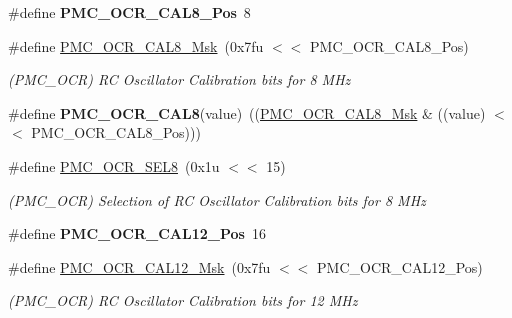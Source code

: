 \begin{DoxyCompactItemize}
\mbox{\label{group__SAMV71__PMC_gaeae5979b2df8f5a8d390e59e0e88dc6b}} 
\#define {\bfseries P\+M\+C\+\_\+\+O\+C\+R\+\_\+\+C\+A\+L8\+\_\+\+Pos}~8
\item 
\mbox{\label{group__SAMV71__PMC_gaa11a6b2f86faf3641f789b99e88f3413}} 
\#define \mbox{\hyperlink{group__SAMV71__PMC_gaa11a6b2f86faf3641f789b99e88f3413}{P\+M\+C\+\_\+\+O\+C\+R\+\_\+\+C\+A\+L8\+\_\+\+Msk}}~(0x7fu $<$$<$ P\+M\+C\+\_\+\+O\+C\+R\+\_\+\+C\+A\+L8\+\_\+\+Pos)
\begin{DoxyCompactList}\small\item\em (P\+M\+C\+\_\+\+O\+CR) RC Oscillator Calibration bits for 8 M\+Hz \end{DoxyCompactList}\item 
\mbox{\label{group__SAMV71__PMC_ga914c02dfef2c0a80f6ab649772016836}} 
\#define {\bfseries P\+M\+C\+\_\+\+O\+C\+R\+\_\+\+C\+A\+L8}(value)~((\mbox{\hyperlink{group__SAMV71__PMC_gaa11a6b2f86faf3641f789b99e88f3413}{P\+M\+C\+\_\+\+O\+C\+R\+\_\+\+C\+A\+L8\+\_\+\+Msk}} \& ((value) $<$$<$ P\+M\+C\+\_\+\+O\+C\+R\+\_\+\+C\+A\+L8\+\_\+\+Pos)))
\item 
\mbox{\label{group__SAMV71__PMC_ga78fbc712afb0e5fbacf4cf74ca649d5d}} 
\#define \mbox{\hyperlink{group__SAMV71__PMC_ga78fbc712afb0e5fbacf4cf74ca649d5d}{P\+M\+C\+\_\+\+O\+C\+R\+\_\+\+S\+E\+L8}}~(0x1u $<$$<$ 15)
\begin{DoxyCompactList}\small\item\em (P\+M\+C\+\_\+\+O\+CR) Selection of RC Oscillator Calibration bits for 8 M\+Hz \end{DoxyCompactList}\item 
\mbox{\label{group__SAMV71__PMC_ga487cc6f01c426ec8d88d53833cadd948}} 
\#define {\bfseries P\+M\+C\+\_\+\+O\+C\+R\+\_\+\+C\+A\+L12\+\_\+\+Pos}~16
\item 
\mbox{\label{group__SAMV71__PMC_gaebcde6b9f684f22e620db9673ab3131a}} 
\#define \mbox{\hyperlink{group__SAMV71__PMC_gaebcde6b9f684f22e620db9673ab3131a}{P\+M\+C\+\_\+\+O\+C\+R\+\_\+\+C\+A\+L12\+\_\+\+Msk}}~(0x7fu $<$$<$ P\+M\+C\+\_\+\+O\+C\+R\+\_\+\+C\+A\+L12\+\_\+\+Pos)
\begin{DoxyCompactList}\small\item\em (P\+M\+C\+\_\+\+O\+CR) RC Oscillator Calibration bits for 12 M\+Hz \end{DoxyCompactList}\item 

\end{DoxyCompactItemize}
